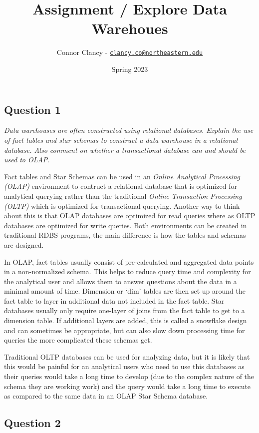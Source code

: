 \documentclass[
]{article}
\title{Assignment / Explore Data Warehoues}
\author{Connor Clancy -
\href{mailto:clancy.co@northeastern.edu}{\nolinkurl{clancy.co@northeastern.edu}}}
\date{Spring 2023}
\begin{document}
\maketitle

\hypertarget{question-1}{%
\subsection{Question 1}\label{question-1}}

\emph{Data warehouses are often constructed using relational databases.
Explain the use of fact tables and star schemas to construct a data
warehouse in a relational database. Also comment on whether a
transactional database can and should be used to OLAP.}

Fact tables and Star Schemas can be used in an \emph{Online Analytical
Processing (OLAP)} environment to contruct a relational database that is
optimized for analytical querying rather than the traditional
\emph{Online Transaction Processing (OLTP)} which is optimized for
transactional querying. Another way to think about this is that OLAP
databases are optimized for read queries where as OLTP databases are
optimized for write queries. Both environments can be created in
traditional RDBS programs, the main difference is how the tables and
schemas are designed.

In OLAP, fact tables usually consist of pre-calculated and aggregated
data points in a non-normalized schema. This helps to reduce query time
and complexity for the analytical user and allows them to answer
questions about the data in a minimal amount of time. Dimension or `dim'
tables are then set up around the fact table to layer in additional data
not included in the fact table. Star databases usually only require
one-layer of joins from the fact table to get to a dimension table. If
additional layers are added, this is called a snowflake design and can
sometimes be appropriate, but can also slow down processing time for
queries the more complicated these schemas get.

Traditional OLTP databases can be used for analyzing data, but it is
likely that this would be painful for an analytical users who need to
use this databases as their queries would take a long time to develop
(due to the complex nature of the schema they are working work) and the
query would take a long time to execute as compared to the same data in
an OLAP Star Schema database.

\hypertarget{question-2}{%
\subsection{Question 2}\label{question-2}}
\end{document}
